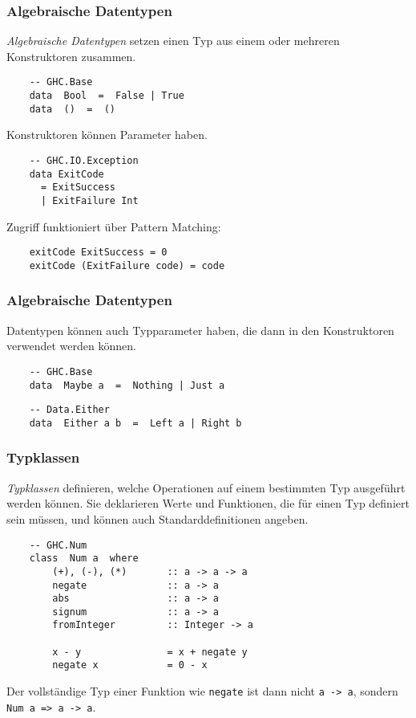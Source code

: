 \documentclass{beamer}
\begin{document}
\begin{frame}[fragile]
  \frametitle{Algebraische Datentypen}
  \emph{Algebraische Datentypen} setzen einen Typ aus einem oder mehreren Konstruktoren zusammen.
  \begin{lstlisting}
    -- GHC.Base
    data  Bool  =  False | True
    data  ()  =  ()
  \end{lstlisting}
  Konstruktoren können Parameter haben.
  \begin{lstlisting}
    -- GHC.IO.Exception
    data ExitCode
      = ExitSuccess
      | ExitFailure Int
  \end{lstlisting}
  Zugriff funktioniert über Pattern Matching:
  \begin{lstlisting}
    exitCode ExitSuccess = 0
    exitCode (ExitFailure code) = code
  \end{lstlisting}
\end{frame}

\begin{frame}[fragile]
  \frametitle{Algebraische Datentypen}
  Datentypen können auch Typparameter haben, die dann in den Konstruktoren verwendet werden können.
  \begin{lstlisting}
    -- GHC.Base
    data  Maybe a  =  Nothing | Just a
  \end{lstlisting}
  \begin{lstlisting}
    -- Data.Either
    data  Either a b  =  Left a | Right b
  \end{lstlisting}
\end{frame}

\begin{frame}[fragile]
  \frametitle{Typklassen}
  \emph{Typklassen} definieren, welche Operationen auf einem bestimmten Typ ausgeführt werden können.
  Sie deklarieren Werte und Funktionen, die für einen Typ definiert sein müssen, und können auch Standarddefinitionen angeben.
  \begin{lstlisting}
    -- GHC.Num
    class  Num a  where
        (+), (-), (*)       :: a -> a -> a
        negate              :: a -> a
        abs                 :: a -> a
        signum              :: a -> a
        fromInteger         :: Integer -> a
    
        x - y               = x + negate y
        negate x            = 0 - x
  \end{lstlisting}
  Der vollständige Typ einer Funktion wie \lstinline{negate} ist dann nicht \lstinline{a -> a}, sondern \lstinline{Num a => a -> a}.
\end{frame}
\end{document}
